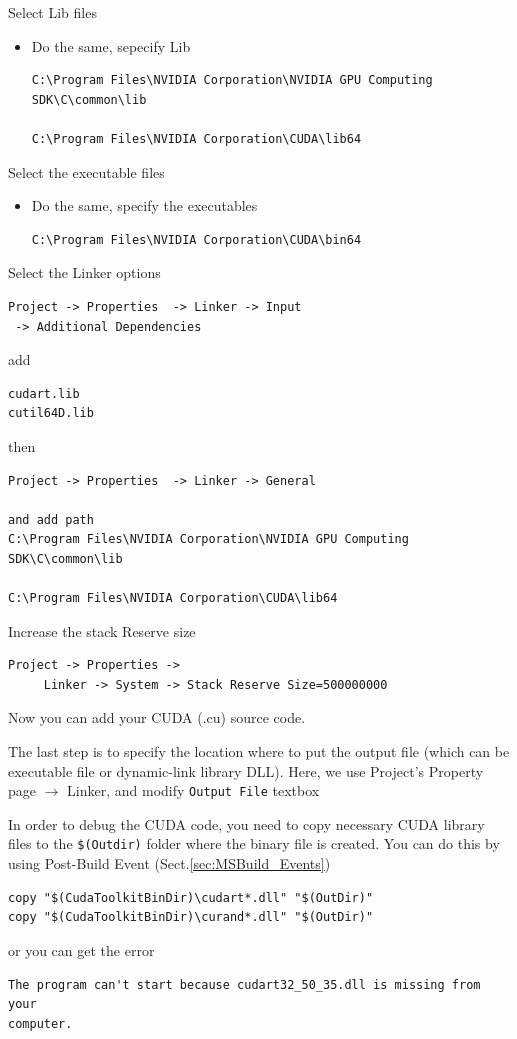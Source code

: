 Select Lib files
\begin{itemize}
  \item Do the same, sepecify Lib
\begin{verbatim}
C:\Program Files\NVIDIA Corporation\NVIDIA GPU Computing SDK\C\common\lib

C:\Program Files\NVIDIA Corporation\CUDA\lib64
\end{verbatim}  
\end{itemize}

Select the executable files
\begin{itemize}
  \item Do the same, specify the executables
\begin{verbatim}
C:\Program Files\NVIDIA Corporation\CUDA\bin64
\end{verbatim}
\end{itemize}


Select the Linker options
\begin{verbatim}
Project -> Properties  -> Linker -> Input
 -> Additional Dependencies
\end{verbatim}
add 
\begin{verbatim}
cudart.lib
cutil64D.lib
\end{verbatim}
then
\begin{verbatim}
Project -> Properties  -> Linker -> General

and add path
C:\Program Files\NVIDIA Corporation\NVIDIA GPU Computing SDK\C\common\lib

C:\Program Files\NVIDIA Corporation\CUDA\lib64
\end{verbatim}

Increase the stack Reserve size
\begin{verbatim}
Project -> Properties ->
     Linker -> System -> Stack Reserve Size=500000000
\end{verbatim}

Now you can add your CUDA (.cu) source code. 

The last step is to specify the location where to put the output file (which
can be executable file or dynamic-link library DLL). Here, we use Project's
Property page $\rightarrow$ Linker, and modify \verb!Output File! textbox


In order to debug the CUDA code, you need to copy necessary CUDA library files
to the \verb!$(Outdir)! folder where the binary file is created. You can do this
by using Post-Build Event (Sect.\ref{sec:MSBuild_Events})
\begin{verbatim}
copy "$(CudaToolkitBinDir)\cudart*.dll" "$(OutDir)"
copy "$(CudaToolkitBinDir)\curand*.dll" "$(OutDir)"
\end{verbatim}
or you can get the error
\begin{verbatim}
The program can't start because cudart32_50_35.dll is missing from your
computer.
\end{verbatim}





